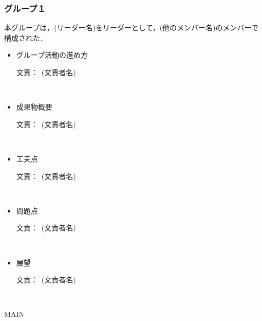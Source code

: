 \documentclass[a4paper]{jarticle}
\newcommand{\resp}[1]{\begin{flushright}文責：~#1\end{flushright}~\\}
\begin{document}
\fi

\subsubsection{グループ１}
    
    本グループは，(リーダー名)をリーダーとして，(他のメンバー名)のメンバーで構成された．

    \begin{itemize}
        \item グループ活動の進め方
        
        \resp{(文責者名)}


        \item 成果物概要
        
        \resp{(文責者名)}


        \item 工夫点
        
        \resp{(文責者名)}


        \item 問題点
        
        \resp{(文責者名)}


        \item 展望
        
        \resp{(文責者名)}


    \end{itemize}

\expandafter\ifx\csname MAIN \endcsname\relax
  
\end{document}
